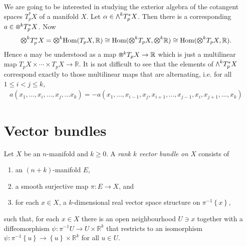 \documentclass{article}
\begin{document}
\begin{example}
  We are going to be interested in studying the exterior
  algebra of the cotangent spaces $T_p^* X$ of a manifold $X$.
  Let $\alpha\in \exterior{k}{T^*_p X}$. Then there is a corresponding $a\in
  \tensor{k}{T_p^* X}$. Now
  \begin{align*}
    \tensor{k}{T_p^* X} = \tensor{k}{\Hom(T_p X,\mathbb{R})} \cong \Hom(\tensor{k}{T_p X}, \tensor{k}{\mathbb{R}}) \cong \Hom(\tensor{k}{T_p X},\mathbb{R}).
  \end{align*}
  Hence $a$ may be understood as a map $\tensor{k}{T_p X}\to\mathbb{R}$
  which is just a multilinear map $T_p X\times\cdots\times T_p X\to\mathbb{R}$. It is not difficult to see that the elements of $\exterior{k}{T^*_p X}$
  correspond exactly to those multilinear maps that are alternating,
  i.e. for all $1\leq i < j\leq k$,
  \begin{align*}
    a(x_1,\ldots,x_i,\ldots,x_j,\ldots x_k) = -a(x_1,\ldots,x_{i-1},x_j,x_{i+1},\ldots,x_{j-1},x_i,x_{j+1},\ldots,x_k)
  \end{align*}
\end{example}

\section{Vector bundles}

\begin{definition}
  Let $X$ be an $n$-manifold and $k\geq 0$.
  A \emph{rank $k$ vector bundle on $X$} consists of
  \begin{enumerate}
    \item an $(n+k)$-manifold $E$,
    \item a smooth surjective map $\pi : E\to X$, and
    \item for each $x\in X$, a $k$-dimensional real vector space structure on ${\pi}^{-1}\left\lbrace{x}\right\rbrace$,
  \end{enumerate}
  such that, for each $x\in X$ there is an open neighbourhood $U\ni x$
  together with a diffeomorphism $\psi : {\pi}^{-1} U \to U\times\mathbb{R}^k$ that restricts to an isomorphism $\psi : {\pi}^{-1}\left\lbrace{u}\right\rbrace\to \left\lbrace{u}\right\rbrace\times\mathbb{R}^k$ for all $u\in U$.
\end{definition}
\end{document}
